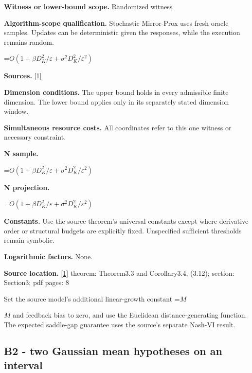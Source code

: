 \documentclass[10pt,a4paper]{article}
\newcommand{\AtlasMath}[1]{\par\begingroup\centering\setbox0=\hbox{$\displaystyle #1$}\ifdim\wd0>1.4\linewidth\typeout{ATLAS WIDE FORMULA: \the\wd0}\fi\ifdim\wd0>\linewidth\resizebox{\linewidth}{!}{\box0}\else\box0\fi\par\endgroup}
\newcommand{\AtlasInlineMath}[1]{\begingroup\setbox0=\hbox{$#1$}\ifdim\wd0>.4\linewidth\endgroup\AtlasMath{#1}\else\endgroup$#1$\fi}
\begin{document}
\textbf{Witness or lower-bound scope.} Randomized witness



\textbf{Algorithm-scope qualification.} Stochastic Mirror-Prox uses fresh oracle samples. Updates can be deterministic given the responses, while the execution remains random.



\AtlasMath{O(1+\beta D_K^2/\varepsilon+\sigma^2D_K^2/\varepsilon^2)}


\textbf{Sources.} \href{https://www.isye.gatech.edu/~nemirovs/SMP.pdf}{[1]}



\textbf{Dimension conditions.} The upper bound holds in every admissible finite dimension. The lower bound applies only in its separately stated dimension window.



\textbf{Simultaneous resource costs.} All coordinates refer to this one witness or necessary constraint.



\textbf{N sample.}



\AtlasMath{O(1+\beta D_K^2/\varepsilon+\sigma^2D_K^2/\varepsilon^2)}


\textbf{N projection.}



\AtlasMath{O(1+\beta D_K^2/\varepsilon+\sigma^2D_K^2/\varepsilon^2)}


\textbf{Constants.} Use the source theorem’s universal constants except where derivative order or structural budgets are explicitly fixed. Unspecified sufficient thresholds remain symbolic.



\textbf{Logarithmic factors.} None.



\textbf{Source location.} \href{https://www.isye.gatech.edu/~nemirovs/SMP.pdf}{[1]} theorem: Theorem3.3 and Corollary3.4, (3.12); section: Section3; pdf pages: 8



Set the source model's additional linear-growth constant \AtlasInlineMath{M} and feedback bias to zero, and use the Euclidean distance-generating function. The expected saddle-gap guarantee uses the source's separate Nash-VI result.



\subsection{B2 - two Gaussian mean hypotheses on an interval}
\end{document}
